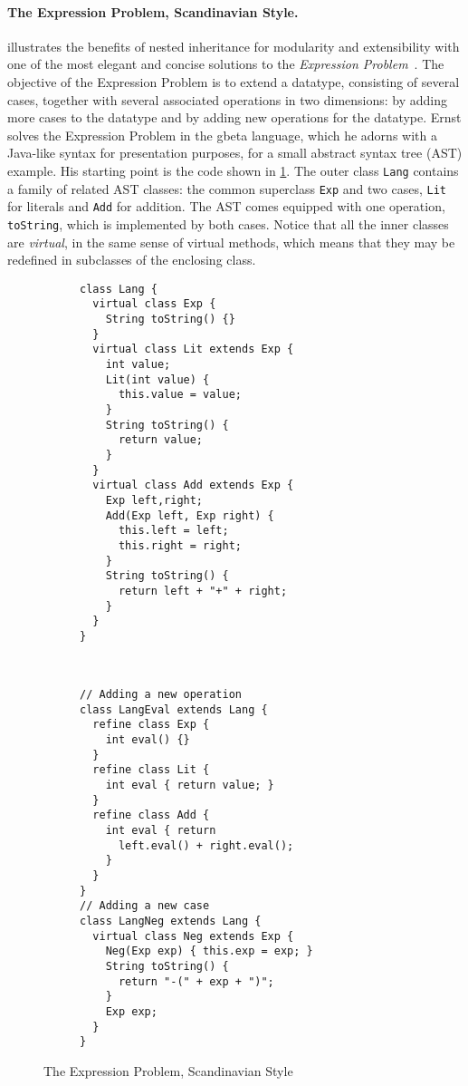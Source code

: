 \paragraph{The Expression Problem, Scandinavian Style.}
\citet{Ernst_2001} illustrates the benefits of nested inheritance for modularity
and extensibility with one of the most elegant and concise solutions to the
\emph{Expression Problem}~\citep{wadler1998expression}. The objective of the
Expression Problem is to extend a datatype, consisting of several cases,
together with several associated operations in two dimensions: by adding more
cases to the datatype and by adding new operations for the datatype. Ernst
solves the Expression Problem in the gbeta language, which he adorns with a
Java-like syntax for presentation purposes, for a small abstract syntax tree
(AST) example. His starting point is the code shown in \cref{fig:lang}. The
outer class \lstinline{Lang} contains a family of related AST classes: the
common superclass \lstinline{Exp} and two cases, \lstinline{Lit} for literals
and \lstinline{Add} for addition. The AST comes equipped with one operation,
\lstinline{toString}, which is implemented by both cases. Notice that all the
inner classes are \textit{virtual}, in the same sense of virtual methods, which
means that they may be redefined in subclasses of the enclosing class.


\begin{figure}[t]
    \centering
    \begin{subfigure}[b]{0.45\textwidth}
\begin{lstlisting}[language=gbeta]
class Lang {
  virtual class Exp {
    String toString() {}
  }
  virtual class Lit extends Exp {
    int value;
    Lit(int value) {
      this.value = value;
    }
    String toString() {
      return value;
    }
  }
  virtual class Add extends Exp {
    Exp left,right;
    Add(Exp left, Exp right) {
      this.left = left;
      this.right = right;
    }
    String toString() {
      return left + "+" + right;
    }
  }
}
\end{lstlisting}
 \label{fig:lang}
    \end{subfigure} ~
    \begin{subfigure}[b]{0.5\textwidth}
\begin{lstlisting}[language=gbeta,  xleftmargin=1mm]
// Adding a new operation
class LangEval extends Lang {
  refine class Exp {
    int eval() {}
  }
  refine class Lit {
    int eval { return value; }
  }
  refine class Add {
    int eval { return
      left.eval() + right.eval();
    }
  }
}
// Adding a new case
class LangNeg extends Lang {
  virtual class Neg extends Exp {
    Neg(Exp exp) { this.exp = exp; }
    String toString() {
      return "-(" + exp + ")";
    }
    Exp exp;
  }
}
\end{lstlisting}
 \label{fig:extend}
    \end{subfigure}
    \caption{The Expression Problem, Scandinavian Style}
\end{figure}

